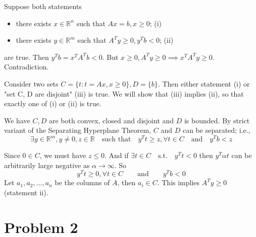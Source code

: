 \documentclass[12pt,letterpaper]{article}
\begin{document}
\begin{alphalist}
\item
    Suppose both statements
    \begin{itemize}
        \item there exists $x \in \mathbb{R}^n$ such that $Ax = b, x \ge 0$; (i)
        \item there exists $y \in \mathbb{R}^m$ such that $A^Ty \ge 0, y^Tb <
            0$; (ii)
    \end{itemize}

    are true. Then $y^Tb = x^TA^Tb < 0$. But $x \ge 0, A^Ty \ge 0 \implies
    x^TA^Ty \ge 0$. Contradiction.

    Consider two sets $C = \{t : t = Ax, x \ge 0\}, D = \{ b \}$. Then either
    statement (i) or "set C, D are disjoint" (iii) is true. We will show
    that (iii) implies (ii), so that exactly one of (i) or (ii) is true.

    We have $C, D$ are both convex, closed and disjoint and $D$ is bounded. By
    strict variant of the Separating Hyperplane Theorem, $C$ and $D$ can be
    separated; i.e.,
    \[
        \exists y \in \mathbb{R}^m, y \ne 0, z \in \mathbb{R} \quad \text{such
        that}\quad y^Tt \ge z, \forall t \in C \quad \text{and} \quad y^Tb < z
    \]

    Since $0 \in C$, we must have $z \le 0$. And if $\exists t \in C \quad
    \text{s.t.} \quad y^Tt < 0$ then $y^T\alpha{}t$ can be arbitrarily large negative
    as $\alpha \to \infty$. So
    \[
        y^Tt \ge 0, \forall t \in C  \qquad \text{and} \qquad y^Tb < 0
    \]
    Let $a_1, a_2,..., a_n$ be the columns of $A$, then $a_i \in C$. This
    implies $A^Ty \ge 0$ (statement ii).
\end{alphalist}

\newpage
\section*{Problem 2}
\end{document}
